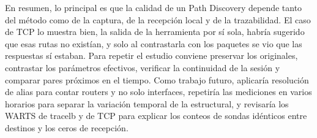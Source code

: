 En resumen, lo principal es que la calidad de un Path Discovery depende tanto del método como de la captura, de la recepción local y de la trazabilidad. El caso de TCP lo muestra bien, la salida de la herramienta por sí sola, habría sugerido que esas rutas no existían, y solo al contrastarla con los paquetes se vio que las respuestas sí estaban. Para repetir el estudio conviene preservar los originales, contrastar los parámetros efectivos, verificar la continuidad de la sesión y comparar pares próximos en el tiempo. Como trabajo futuro, aplicaría resolución de alias para contar routers y no solo interfaces, repetiría las mediciones en varios horarios para separar la variación temporal de la estructural, y revisaría los WARTS de tracelb y de TCP para explicar los conteos de sondas idénticos entre destinos y los ceros de recepción.






